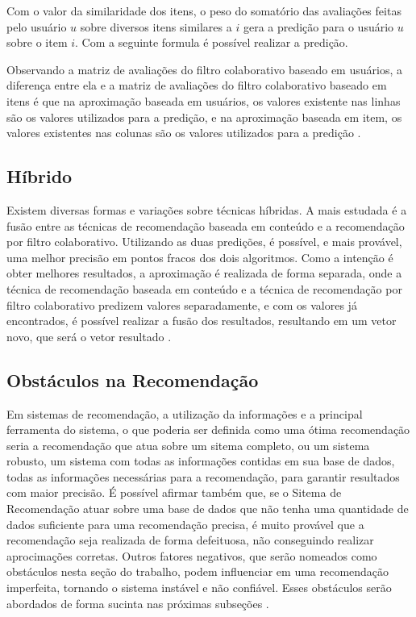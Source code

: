 \documentclass[12pt,
				openright,
				twoside,
				a4paper,
				apter=TITLE,
				section=TITLE,
				subsection=TITLE,
				chapter=TITLE,
				english,
				brazil]{abntex2}
\begin{document}

Com o valor da similaridade dos itens, o peso do somatório das avaliações feitas pelo usuário $u$ sobre diversos itens similares a $i$ gera a predição para o usuário $u$ sobre o item $i$. Com a seguinte formula é possível realizar a predição.


Observando a matriz de avaliações do filtro colaborativo baseado em usuários, a diferença entre ela e a matriz de avaliações do filtro colaborativo baseado em itens é que na aproximação baseada em usuários, os valores existente nas linhas são os valores utilizados para a predição, e na aproximação baseada em item, os valores existentes nas colunas são os valores utilizados para a predição \cite{sarwar2001item}. 


\subsection{Híbrido}
Existem diversas formas e variações sobre técnicas híbridas. A mais estudada é a fusão entre as técnicas de recomendação baseada em conteúdo e a recomendação por filtro colaborativo. Utilizando as duas predições, é possível, e mais provável, uma melhor precisão em pontos fracos dos dois algoritmos. Como a intenção é obter melhores resultados, a aproximação é realizada de forma separada, onde a técnica de recomendação baseada em conteúdo e a técnica de recomendação por filtro colaborativo predizem valores separadamente, e com os valores já encontrados, é possível realizar a fusão dos resultados, resultando em um vetor novo, que será o vetor resultado \cite{melville2010recommender}.


\subsection{Obstáculos na Recomendação}
Em sistemas de recomendação, a utilização da informações e a principal ferramenta do sistema, o que poderia ser definida como uma ótima recomendação seria a recomendação que atua sobre um sitema completo, ou um sistema robusto, um sistema com todas as informações contidas em sua base de dados, todas as informações necessárias para a recomendação, para garantir resultados com maior precisão. É possível afirmar também que, se o Sitema de Recomendação atuar sobre uma base de dados que não tenha uma quantidade de dados suficiente para uma recomendação precisa, é muito provável que a recomendação seja realizada de forma defeituosa, não conseguindo realizar aprocimações corretas. Outros fatores negativos, que serão nomeados como obstáculos nesta seção do trabalho, podem  influenciar em uma recomendação imperfeita, tornando o sistema instável e não confiável. Esses obstáculos serão abordados de forma sucinta nas próximas subseções \cite{konstan1998recommender}.
\end{document}
